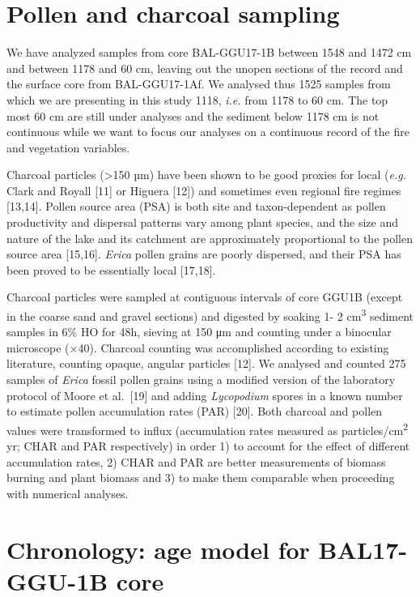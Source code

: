 \documentclass[
]{article}
\newcommand\textsub[1]{\stackengine{-.5ex}{}{\scriptsize#1}{O}{l}{F}{F}{L}}
\begin{document}
\hypertarget{pollen-and-charcoal-sampling}{%
\section{Pollen and charcoal
sampling}\label{pollen-and-charcoal-sampling}}

We have analyzed samples from core BAL-GGU17-1B between 1548 and 1472 cm
and between 1178 and 60 cm, leaving out the unopen sections of the
record and the surface core from BAL-GGU17-1Af. We analysed thus 1525
samples from which we are presenting in this study 1118, \emph{i.e.}
from 1178 to 60 cm. The top most 60 cm are still under analyses and the
sediment below 1178 cm is not continuous while we want to focus our
analyses on a continuous record of the fire and vegetation variables.

Charcoal particles (\textgreater150 µm) have been shown to be good
proxies for local (\emph{e.g.} Clark and Royall {[}11{]} or Higuera
{[}12{]}) and sometimes even regional fire regimes {[}13,14{]}. Pollen
source area (PSA) is both site and taxon-dependent as pollen
productivity and dispersal patterns vary among plant species, and the
size and nature of the lake and its catchment are approximately
proportional to the pollen source area {[}15,16{]}. \emph{Erica} pollen
grains are poorly dispersed, and their PSA has been proved to be
essentially local {[}17,18{]}.

Charcoal particles were sampled at contiguous intervals of core GGU1B
(except in the coarse sand and gravel sections) and digested by soaking
1- 2 cm\textsuperscript{3} sediment samples in 6\%
H\textsub{2}O\textsub{2} for 48h, sieving at 150 μm and counting under a
binocular microscope (×40). Charcoal counting was accomplished according
to existing literature, counting opaque, angular particles {[}12{]}. We
analysed and counted 275 samples of \emph{Erica} fossil pollen grains
using a modified version of the laboratory protocol of Moore et
al.~{[}19{]} and adding \emph{Lycopodium} spores in a known number to
estimate pollen accumulation rates (PAR) {[}20{]}. Both charcoal and
pollen values were transformed to influx (accumulation rates measured as
particles/cm\textsuperscript{2} yr; CHAR and PAR respectively) in order
1) to account for the effect of different accumulation rates, 2) CHAR
and PAR are better measurements of biomass burning and plant biomass and
3) to make them comparable when proceeding with numerical analyses.

\hypertarget{chronology-age-model-for-bal17-ggu-1b-core}{%
\section{Chronology: age model for BAL17-GGU-1B
core}\label{chronology-age-model-for-bal17-ggu-1b-core}}
\end{document}
